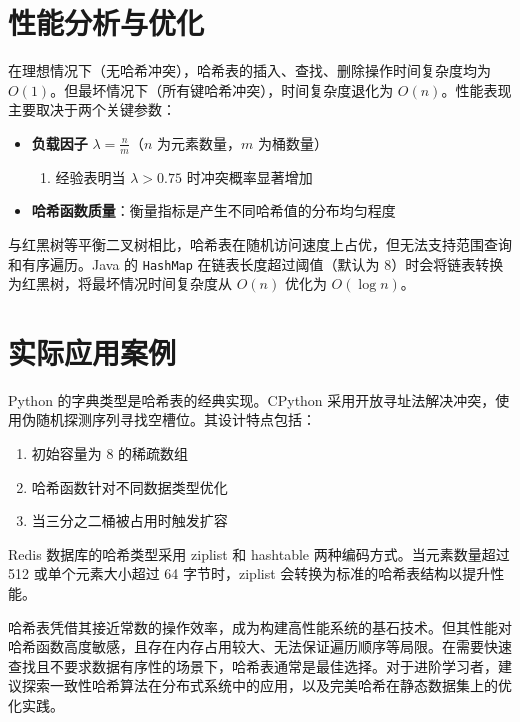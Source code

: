 \chapter{性能分析与优化}
在理想情况下（无哈希冲突），哈希表的插入、查找、删除操作时间复杂度均为 $O(1)$。但最坏情况下（所有键哈希冲突），时间复杂度退化为 $O(n)$。性能表现主要取决于两个关键参数：\par
\begin{itemize}
\item \textbf{负载因子} $\lambda = \frac{n}{m}$（$n$ 为元素数量，$m$ 为桶数量）\begin{enumerate}
\item 经验表明当 $\lambda > 0.75$ 时冲突概率显著增加
\end{enumerate}

\item \textbf{哈希函数质量}：衡量指标是产生不同哈希值的分布均匀程度
\end{itemize}
与红黑树等平衡二叉树相比，哈希表在随机访问速度上占优，但无法支持范围查询和有序遍历。Java 的 \verb!HashMap! 在链表长度超过阈值（默认为 8）时会将链表转换为红黑树，将最坏情况时间复杂度从 $O(n)$ 优化为 $O(\log n)$。\par
\chapter{实际应用案例}
Python 的字典类型是哈希表的经典实现。CPython 采用开放寻址法解决冲突，使用伪随机探测序列寻找空槽位。其设计特点包括：\par
\begin{enumerate}
\item 初始容量为 8 的稀疏数组
\item 哈希函数针对不同数据类型优化
\item 当三分之二桶被占用时触发扩容
\end{enumerate}
Redis 数据库的哈希类型采用 ziplist 和 hashtable 两种编码方式。当元素数量超过 512 或单个元素大小超过 64 字节时，ziplist 会转换为标准的哈希表结构以提升性能。\par
哈希表凭借其接近常数的操作效率，成为构建高性能系统的基石技术。但其性能对哈希函数高度敏感，且存在内存占用较大、无法保证遍历顺序等局限。在需要快速查找且不要求数据有序性的场景下，哈希表通常是最佳选择。对于进阶学习者，建议探索一致性哈希算法在分布式系统中的应用，以及完美哈希在静态数据集上的优化实践。\par

